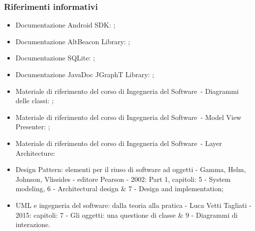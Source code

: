 \documentclass[../DefinizioneDiProdotto.tex]{subfiles}
\begin{document}
		\subsubsection{Riferimenti informativi}
		\begin{itemize}
			\item Documentazione Android SDK: ;
			\item Documentazione AltBeacon Library: ;
			\item Documentazione SQLite: ;
			\item Documentazione JavaDoc JGraphT Library: ;
			\item Materiale di riferimento del corso di Ingegneria del Software\g\ - Diagrammi delle classi: ;
			\item Materiale di riferimento del corso di Ingegneria del Software\g\ - Model View Presenter: ;
			\item Materiale di riferimento del corso di Ingegneria del Software\g\ - Layer Architecture: 
			\item Design Pattern: elementi per il riuso di software ad oggetti - Gamma, Helm, Johnson, Vlissides - editore Pearson - 2002: Part 1, capitoli: 5 - System modeling, 6 - Architectural design \& 7 - Design and implementation;
			\item UML e ingegneria del software: dalla teoria alla pratica - Luca Vetti Tagliati - 2015: capitoli: 7 - Gli oggetti: una questione di classe \& 9 - Diagrammi di interazione.
		\end{itemize}
		
\end{document}
